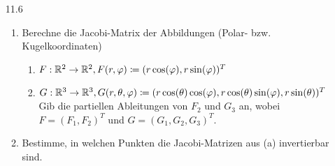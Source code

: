 \documentclass{../HM}
\begin{document}
\begin{enumerate}
\begin{enumerate}
		\end{enumerate}
		\item[11.6]
		\begin{enumerate}
			\item Berechne die Jacobi-Matrix der Abbildungen (Polar- bzw. Kugelkoordinaten)
			\begin{enumerate}
				\item $F:\mathbb{R}^2 \to \mathbb{R}^2,F(r,\varphi)\coloneqq(r \cos(\varphi), r\sin(\varphi))^T$
				\item $G: \mathbb{R}^3 \to \mathbb{R}^3, G(r, \theta, \varphi)\coloneqq(r \cos(\theta) \cos(\varphi), r\cos(\theta)\sin(\varphi),r\sin(\theta))^T$\\
				Gib die partiellen Ableitungen von $F_2$ und $G_3$ an, wobei $F = (F_1 , F_2 )^T$ und $G = (G_1 , G_2 , G_3 )^T$.
			\end{enumerate}
		\item Bestimme, in welchen Punkten die Jacobi-Matrizen aus (a) invertierbar sind.
		\end{enumerate}

	\end{enumerate}
\end{document}
